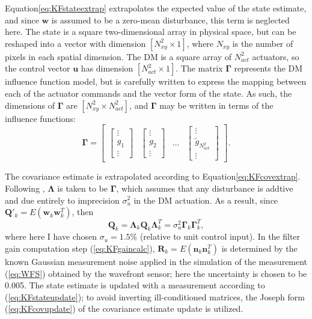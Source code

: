 \documentclass[11pt,reqno]{amsart}
\newcommand{\beq}{\begin{equation}}
\newcommand{\eeq}{\end{equation}}
\newcommand{\bmat}{\left[\begin{matrix}}
\newcommand{\emat}{\end{matrix}\right]}
\newcommand{\bsym}{\boldsymbol}
\newcommand{\mbf}{\mathbf}
\begin{document}
Equation\:\ref{eq:KFstateextrap} extrapolates the expected value of the state estimate, and since $\mbf{w}$ is assumed to be a zero-mean disturbance, this term is neglected here.  The state is a square two-dimensional array in physical space, but can be reshaped into a vector with dimension $\left[N_{xy}^2\times1\right]$, where $N_{xy}$ is the number of pixels in each spatial dimension.  The DM is a square array of $N_{act}^2$ actuators, so the control vector $\mbf{u}$ has dimension $\left[N_{act}^2\times1\right]$.  The matrix $\bsym{\Gamma}$ represents the DM influence function model, but is carefully written to express the mapping between each of the actuator commands and the vector form of the state.  As such, the dimensions of $\bsym{\Gamma}$ are $\left[N_{xy}^2\times N_{act}^2\right]$, and $\bsym{\Gamma}$ may be written in terms of the influence functions:
\beq
	\bsym{\Gamma} = \bmat
		\begin{bmatrix} \vdots\\ g_1\\ \vdots \end{bmatrix} &
		\begin{bmatrix} \vdots\\ g_2\\ \vdots \end{bmatrix} &
		\ldots & \begin{bmatrix} \vdots\\\tilde{g}_{N_{act}^2}\\ \vdots \end{bmatrix}
	\emat.
\eeq

The covariance estimate is extrapolated according to Equation\:\ref{eq:KFcovextrap}.  Following \cite{Groff2012}, $\bsym{\Lambda}$ is taken to be $\bsym{\Gamma}$, which assumes that any disturbance is addtive and due entirely to imprecision $\sigma^2_u$ in the DM actuation.  As a result, since $\mbf{Q}'_k = E\left(\mbf{w}_k\mbf{w}_k^T\right)$, then
\beq
	\mbf{Q}_k = \bsym{\Lambda}_k\mbf{Q}_k\bsym{\Lambda}_k^T = \sigma^2_u\bsym{\Gamma}_k\bsym{\Gamma}_k^T,
\eeq
where here I have chosen $\sigma_u = 1.5\%$ (relative to unit control input). In the filter gain computation step (\ref{eq:KFgaincalc}), $\mbf{R}_k = E\left(\mbf{n}_k\mbf{n}_k^T\right)$ is determined by the known Gaussian measurement noise applied in the simulation of the measurement (\ref{eq:WFS}) obtained by the wavefront sensor; here the uncertainty is chosen to be 0.005.  The state estimate is updated with a measurement according to (\ref{eq:KFstateupdate}); to avoid inverting ill-conditioned matrices, the Joseph form (\ref{eq:KFcovupdate}) of the covariance estimate update is utilized.
\end{document}
